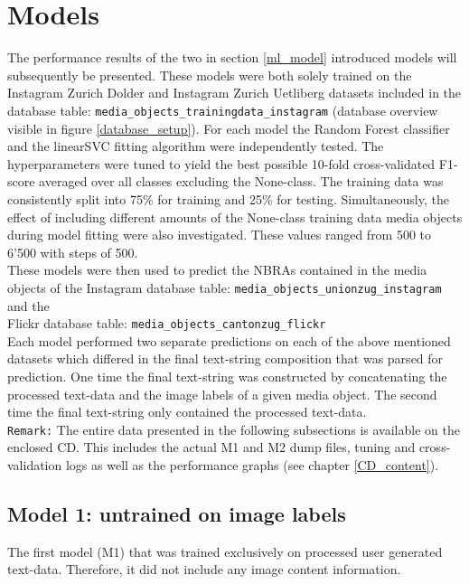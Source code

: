 \section{Models} \label{results_models}
The performance results of the two in section \ref{ml_model} introduced models will subsequently be presented. These models were both solely trained on the Instagram Zurich Dolder and Instagram Zurich Uetliberg datasets included in the database table: \texttt{media\_objects\_trainingdata\_instagram} (database overview visible in figure \ref{database_setup}). For each model the Random Forest classifier and the linearSVC fitting algorithm were independently tested. The hyperparameters were tuned to yield the best possible 10-fold cross-validated F1-score averaged over all classes excluding the None-class. The training data was consistently split into 75\% for training and 25\% for testing. Simultaneously, the effect of including different amounts of the None-class training data media objects during model fitting were also investigated. These values ranged from 500 to 6'500 with steps of 500.\\
These models were then used to predict the NBRAs contained in the media objects of the Instagram database table: \texttt{media\_objects\_unionzug\_instagram} and the \\Flickr database table: \texttt{media\_objects\_cantonzug\_flickr}\\
Each model performed two separate predictions on each of the above mentioned datasets which differed in the final text-string composition that was parsed for prediction. One time the final text-string was constructed by concatenating the processed text-data and the image labels of a given media object. The second time the final text-string only contained the processed text-data.\\
\newline
\texttt{Remark:} The entire data presented in the following subsections is available on the enclosed CD. This includes the actual M1 and M2 dump files, tuning and cross-validation logs as well as the performance graphs (see chapter \ref{CD_content}).

\subsection{Model 1: untrained on image labels}
The first model (M1) that was trained exclusively on processed user generated text-data. Therefore, it did not include any image content information.

